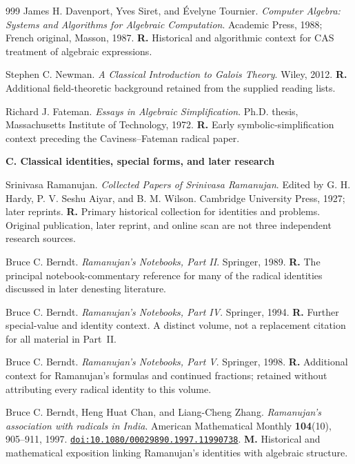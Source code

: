 \documentclass[11pt,a4paper]{article}
\newcommand{\doi}[1]{\href{https://doi.org/#1}{\nolinkurl{doi:#1}}}
\theoremstyle{definition}
\theoremstyle{remark}
\numberwithin{equation}{section}
\begin{document}
\begin{thebibliography}{999}
James H. Davenport, Yves Siret, and \'Evelyne Tournier.
\emph{Computer Algebra: Systems and Algorithms for Algebraic Computation}.
Academic Press, 1988; French original, Masson, 1987.
\textbf{R.} Historical and algorithmic context for CAS treatment of algebraic expressions.

Stephen C. Newman.
\emph{A Classical Introduction to Galois Theory}.
Wiley, 2012.
\textbf{R.} Additional field-theoretic background retained from the supplied reading lists.

Richard J. Fateman.
\emph{Essays in Algebraic Simplification}.
Ph.D. thesis, Massachusetts Institute of Technology, 1972.
\textbf{R.} Early symbolic-simplification context preceding the Caviness--Fateman radical paper.

\item[]\textbf{C. Classical identities, special forms, and later research}

Srinivasa Ramanujan.
\emph{Collected Papers of Srinivasa Ramanujan}.
Edited by G. H. Hardy, P. V. Seshu Aiyar, and B. M. Wilson.
Cambridge University Press, 1927; later reprints.
\textbf{R.} Primary historical collection for identities and problems. Original publication, later reprint, and online scan are not three independent research sources.

Bruce C. Berndt.
\emph{Ramanujan's Notebooks, Part II}.
Springer, 1989.
\textbf{R.} The principal notebook-commentary reference for many of the radical identities discussed in later denesting literature.

Bruce C. Berndt.
\emph{Ramanujan's Notebooks, Part IV}.
Springer, 1994.
\textbf{R.} Further special-value and identity context. A distinct volume, not a replacement citation for all material in Part~II.

Bruce C. Berndt.
\emph{Ramanujan's Notebooks, Part V}.
Springer, 1998.
\textbf{R.} Additional context for Ramanujan's formulas and continued fractions; retained without attributing every radical identity to this volume.

Bruce C. Berndt, Heng Huat Chan, and Liang-Cheng Zhang.
\emph{Ramanujan's association with radicals in India}.
American Mathematical Monthly \textbf{104}(10), 905--911, 1997.
\doi{10.1080/00029890.1997.11990738}.
\textbf{M.} Historical and mathematical exposition linking Ramanujan's identities with algebraic structure.


\end{thebibliography}
\end{document}
